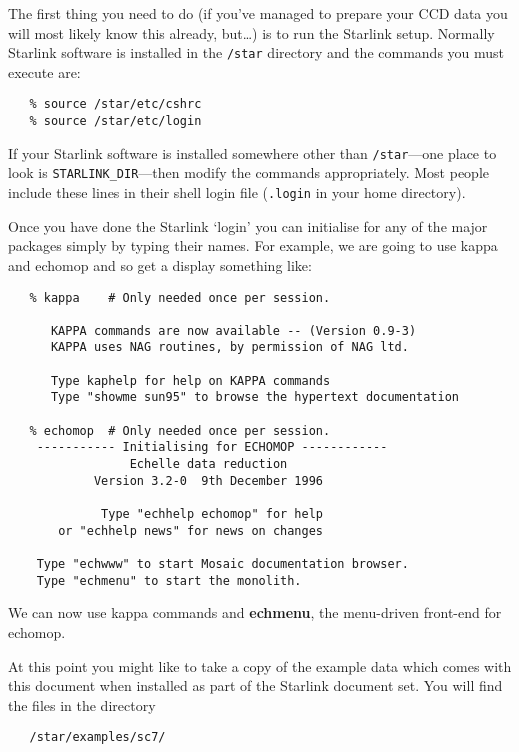 \documentclass[twoside,11pt]{article}
\newcommand{\xref}[3]{#1}
\newcommand{\scspec}[2]{#1}
\newcommand{\scspec}[2]{#2}
\begin{document}
The first thing you need to do (if you've managed to prepare your CCD
data you will most likely know this already, but\ldots ) is to run the
Starlink setup.
Normally Starlink software is installed in the \verb+/star+ directory
and the commands you must execute are:

{
\scspec{\small}{ }
\begin{verbatim}
   % source /star/etc/cshrc
   % source /star/etc/login
\end{verbatim}
}

If your Starlink software is installed somewhere other than 
\verb+/star+---one place to look is \verb+STARLINK_DIR+---then
modify the commands appropriately.  Most people include these lines in
their shell login file (\verb+.login+ in your home directory).

Once you have done the Starlink `login' you can initialise for any of the
major packages simply by typing their names.
For example, we are going to use
\xref{{\sc kappa}}{sun95}{}\cite{kappa} and
\xref{{\sc echomop}}{sun152}{}\cite{echomop} and so get a display
something like:

{
\scspec{\small}{ }
\begin{verbatim}
   % kappa    # Only needed once per session.

      KAPPA commands are now available -- (Version 0.9-3)
      KAPPA uses NAG routines, by permission of NAG ltd.

      Type kaphelp for help on KAPPA commands
      Type "showme sun95" to browse the hypertext documentation

   % echomop  # Only needed once per session.
    ----------- Initialising for ECHOMOP ------------
                 Echelle data reduction
            Version 3.2-0  9th December 1996

             Type "echhelp echomop" for help
       or "echhelp news" for news on changes

    Type "echwww" to start Mosaic documentation browser.
    Type "echmenu" to start the monolith.
\end{verbatim}
}

We can now use {\sc kappa} commands and
\xref{{\bf echmenu}}{sun152}{ECHMENU},
the menu-driven front-end for {\sc echomop}.

At this point you might like to take a copy of the example data which comes
with this document when installed as part of the Starlink document set.
You will find the files in the directory

{
\scspec{\small}{ }
\begin{verbatim}
   /star/examples/sc7/
\end{verbatim}
}
\end{document}
